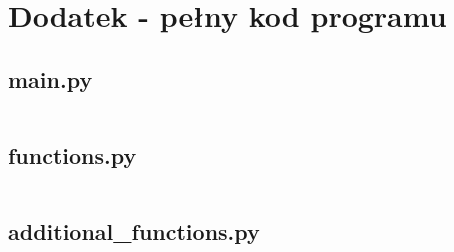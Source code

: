 \documentclass[magister]{dyplom}
\begin{document}
\chapter{Dodatek - pełny kod programu}\label{Dod1}

\section{main.py}
\inputminted[breaklines]{python}{the-wallet/main.py}

\section{functions.py}
\inputminted[breaklines]{python}{the-wallet/functions.py}

\section{additional\_functions.py}
\inputminted[breaklines]{python}{the-wallet/additional_functions.py}


\end{document}
